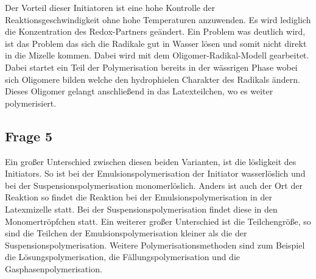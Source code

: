 \documentclass[10pt,a4paper,ngerman]{scrartcl}
\begin{document}
		Der Vorteil dieser Initiatoren ist eine hohe Kontrolle der Reaktionsgeschwindigkeit ohne hohe Temperaturen anzuwenden.
		Es wird lediglich die Konzentration des Redox-Partners geändert.
		Ein Problem was deutlich wird, ist das Problem das sich die Radikale gut in Wasser lösen und somit nicht direkt in die Mizelle kommen.
		Dabei wird mit dem Oligomer-Radikal-Modell gearbeitet. Dabei startet ein Teil der Polymerisation bereits in der wässrigen Phase wobei sich Oligomere bilden welche den 
		hydrophielen Charakter des Radikals ändern. 
		Dieses Oligomer gelangt anschließend in das Latexteilchen, wo es weiter polymerisiert.

	\subsection{Frage 5}

		Ein großer Unterschied zwischen diesen beiden Varianten, ist die lösligkeit des Initiators.
		So ist bei der Emulsionspolymerisation der Initiator wasserlöslich und bei der Suspensionspolymerisation monomerlöslich.
		Anders ist auch der Ort der Reaktion so findet die Reaktion bei der Emulsionspolymerisation in der Latexmizelle statt.
		Bei der Suspensionspolymerisation findet diese in den Monomertröpfchen statt.
		Ein weiterer großer Unterschied ist die Teilchengröße, so sind die Teilchen der Emulsionspolymerisation kleiner als die der Suspensionspolymerisation.
		Weitere Polymerisationsmethoden sind zum Beispiel die Lösungspolymerisation, die Fällungspolymerisation und die Gasphasenpolymerisation.

\printbibliography
\end{document}
